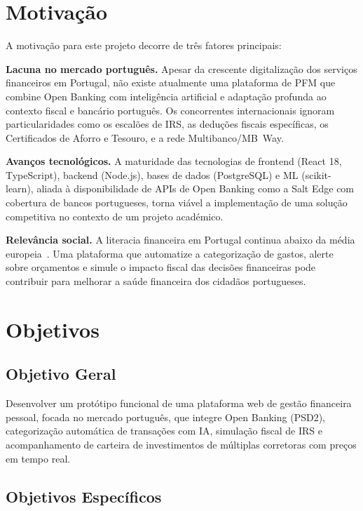 \section{Motivação}
\label{sec:motivacao}

A motivação para este projeto decorre de três fatores principais:

\textbf{Lacuna no mercado português.} Apesar da crescente digitalização dos serviços financeiros em Portugal, não existe atualmente uma plataforma de \ac{PFM} que combine Open Banking com inteligência artificial e adaptação profunda ao contexto fiscal e bancário português. Os concorrentes internacionais ignoram particularidades como os escalões de \ac{IRS}, as deduções fiscais específicas, os Certificados de Aforro e Tesouro, e a rede Multibanco/MB~Way.

\textbf{Avanços tecnológicos.} A maturidade das tecnologias de frontend (React 18, TypeScript), backend (Node.js), bases de dados (PostgreSQL) e \ac{ML} (scikit-learn), aliada à disponibilidade de APIs de Open Banking como a Salt Edge com cobertura de bancos portugueses, torna viável a implementação de uma solução competitiva no contexto de um projeto académico.

\textbf{Relevância social.} A literacia financeira em Portugal continua abaixo da média europeia~\cite{oecd2023}. Uma plataforma que automatize a categorização de gastos, alerte sobre orçamentos e simule o impacto fiscal das decisões financeiras pode contribuir para melhorar a saúde financeira dos cidadãos portugueses.


\section{Objetivos}
\label{sec:objetivos}

\subsection{Objetivo Geral}

Desenvolver um protótipo funcional de uma plataforma web de gestão financeira pessoal, focada no mercado português, que integre Open Banking (\ac{PSD2}), categorização automática de transações com \ac{IA}, simulação fiscal de \ac{IRS} e acompanhamento de carteira de investimentos de múltiplas corretoras com preços em tempo real.

\subsection{Objetivos Específicos}

